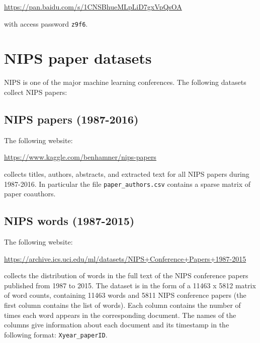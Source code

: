 \documentclass[11pt]{article}
\begin{document}
\url{https://pan.baidu.com/s/1CNSBhueMLpLiD7gxVpQsOA}  

\noindent with access password {\tt z9f6}.

%

%
%
%
%
%
%
%



\section{NIPS paper datasets}
NIPS is one of the major machine learning conferences. The following datasets collect NIPS papers:

\subsection{NIPS papers (1987-2016)} The following website: 

\url{https://www.kaggle.com/benhamner/nips-papers}

\noindent collects titles, authors, abstracts, and extracted text for all NIPS papers during 1987-2016. In particular the file {\texttt{paper\_authors.csv}} contains a sparse matrix of paper coauthors. 

\subsection{NIPS words (1987-2015)} The following website:

\url{https://archive.ics.uci.edu/ml/datasets/NIPS+Conference+Papers+1987-2015}

\noindent collects the distribution of words in the full text of the NIPS conference papers published from 1987 to 2015. The dataset is in the form of a 11463 x 5812 matrix of word counts, containing 11463 words and 5811 NIPS conference papers (the first column contains the list of words). Each column contains the number of times each word appears in the corresponding document. The names of the columns give information about each document and its timestamp in the following format: {\texttt{Xyear\_paperID}}. 
\end{document}
